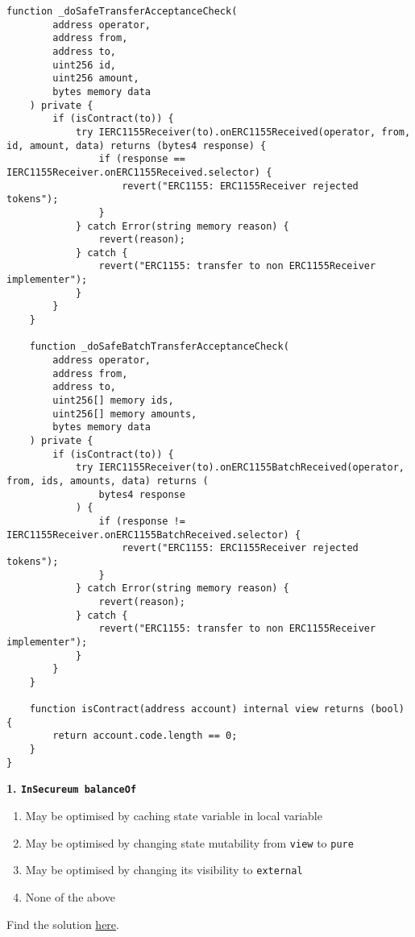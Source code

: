 \begin{lstlisting}[language=Solidity, style=solStyle]
    function _doSafeTransferAcceptanceCheck(
        address operator,
        address from,
        address to,
        uint256 id,
        uint256 amount,
        bytes memory data
    ) private {
        if (isContract(to)) {
            try IERC1155Receiver(to).onERC1155Received(operator, from, id, amount, data) returns (bytes4 response) {
                if (response == IERC1155Receiver.onERC1155Received.selector) {
                    revert("ERC1155: ERC1155Receiver rejected tokens");
                }
            } catch Error(string memory reason) {
                revert(reason);
            } catch {
                revert("ERC1155: transfer to non ERC1155Receiver implementer");
            }
        }
    }

    function _doSafeBatchTransferAcceptanceCheck(
        address operator,
        address from,
        address to,
        uint256[] memory ids,
        uint256[] memory amounts,
        bytes memory data
    ) private {
        if (isContract(to)) {
            try IERC1155Receiver(to).onERC1155BatchReceived(operator, from, ids, amounts, data) returns (
                bytes4 response
            ) {
                if (response != IERC1155Receiver.onERC1155BatchReceived.selector) {
                    revert("ERC1155: ERC1155Receiver rejected tokens");
                }
            } catch Error(string memory reason) {
                revert(reason);
            } catch {
                revert("ERC1155: transfer to non ERC1155Receiver implementer");
            }
        }
    }

    function isContract(address account) internal view returns (bool) {
        return account.code.length == 0;
    }
}
\end{lstlisting}


\textbf{1. \texttt{InSecureum balanceOf}}

\begin{enumerate}[label=\Alph*.]
    \item May be optimised by caching state variable in local variable
    \item May be optimised by changing state mutability from \verb|view| to \verb|pure|
    \item May be optimised by changing its visibility to \verb|external|
    \item None of the above
\end{enumerate}

Find the solution \hyperref[sec:race5_q1]{here}.\\


